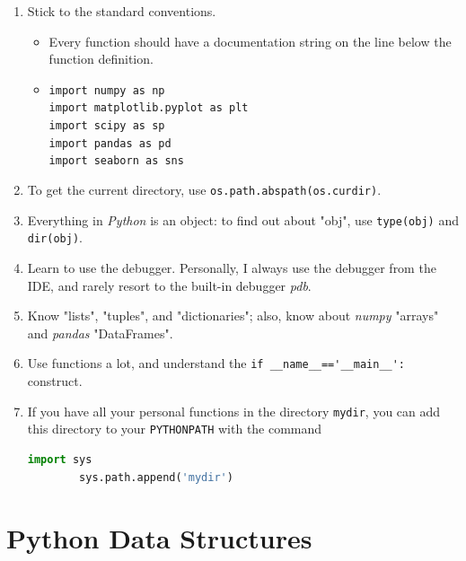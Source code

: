\begin{enumerate}
  \item Stick to the standard conventions.
      \begin{itemize}
        \item Every function should have a documentation string on the line below the function definition.
        \item \lstinline{import numpy as np}\\
            \lstinline{import matplotlib.pyplot as plt}\\
            \lstinline{import scipy as sp}\\
            \lstinline{import pandas as pd}\\
            \lstinline{import seaborn as sns}
      \end{itemize}
  \item To get the current directory, use \lstinline{os.path.abspath(os.curdir)}.
  \item Everything in \emph{Python} is an object: to find out about "obj", use \lstinline{type(obj)} and \lstinline{dir(obj)}.
  \item Learn to use the debugger. Personally, I always use the debugger from the IDE, and rarely resort to the built-in debugger \emph{pdb}.
  \item Know "lists", "tuples", and "dictionaries"; also, know about \emph{numpy} "arrays" and \emph{pandas} "DataFrames".
  \item Use functions a lot, and understand the \lstinline{if __name__=='__main__':} construct.
  \item If you have all your personal functions in the directory \lstinline{mydir}, you can add this directory to your \lstinline{PYTHONPATH} with the command
      \begin{lstlisting}[language=Python]
        import sys
        sys.path.append('mydir')
      \end{lstlisting}
\end{enumerate}

\section{Python Data Structures}

